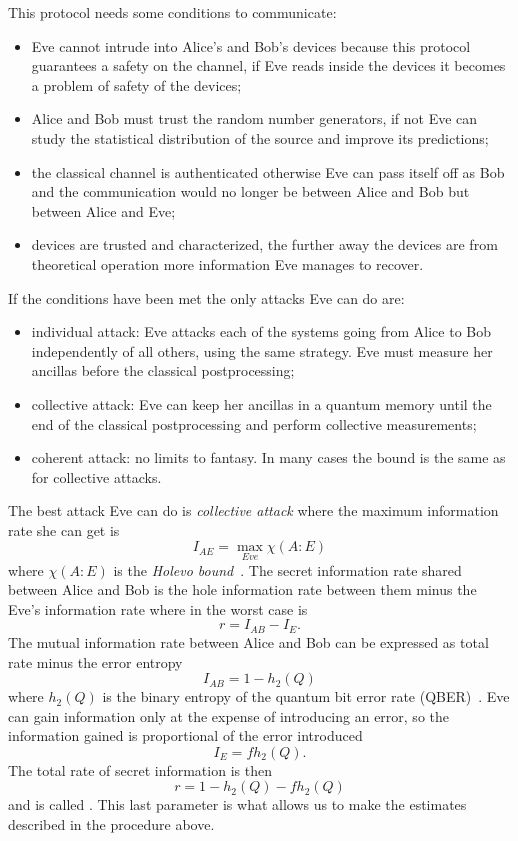 This protocol needs some conditions to communicate:
\begin{itemize}
  \item Eve cannot intrude into Alice’s and Bob’s devices because this protocol guarantees a safety on the channel, if Eve reads inside the devices it becomes a problem of safety of the devices;
  \item Alice and Bob must trust the random number generators, if not Eve can study the statistical distribution of the source and improve its predictions;
  \item the classical channel is authenticated otherwise Eve can pass itself off as Bob and the communication would no longer be between Alice and Bob but between Alice and Eve;
  \item devices are trusted and characterized, the further away the devices are from theoretical operation more information Eve manages to recover.
\end{itemize}

If the conditions have been met the only attacks Eve can do are:
\begin{itemize}
  \item individual attack: Eve attacks each of the systems going from Alice to Bob independently of all others, using the same strategy. Eve must measure her ancillas before the classical postprocessing;
  \item collective attack: Eve can keep her ancillas in a quantum memory until the end of the classical postprocessing and perform collective measurements;
  \item coherent attack: no limits to fantasy. In many cases the bound is the same as for collective attacks.
\end{itemize}

The best attack Eve can do is \textit{collective attack} where the maximum information rate she can get is
\begin{equation}
  I_{AE} = \max_{Eve} \chi(A:E)
\end{equation}
where $\chi(A:E)$ is the \textit{Holevo bound}~\cite{a24}. The secret information rate shared between Alice and Bob is the hole information rate between them minus the Eve's information rate where in the worst case is
\begin{equation}
  r = I_{AB} - I_{E}.
\end{equation}
The mutual information rate between Alice and Bob can be expressed as total rate minus the error entropy
\begin{equation}
  I_{AB} = 1 - h_2(Q)
\end{equation}
where $h_2(Q)$ is the binary entropy of the quantum bit error rate (QBER)~\cite{a24}. Eve can gain information only at the expense of introducing an error, so the information gained is proportional of the error introduced
\begin{equation}
  I_E = f h_2(Q).
\end{equation}
The total rate of secret information is then
\begin{equation}
  r = 1 - h_2(Q) - f h_2(Q)
\end{equation}
and is called . This last parameter is what allows us to make the estimates described in the procedure above.

